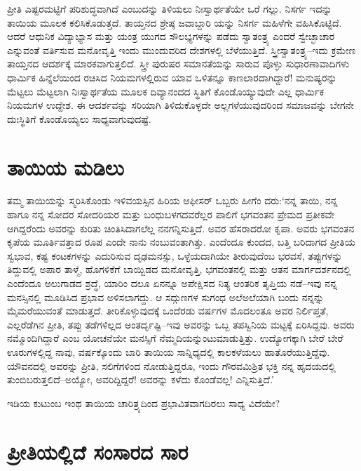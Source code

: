 ಪ್ರೀತಿ ಎಷ್ಟರಮಟ್ಟಿಗೆ ಪರಿಶುದ್ಧವಾಗಿದೆ ಎಂಬುದನ್ನು ತಿಳಿಯಲು ನಿಃಸ್ವಾರ್ಥತೆಯೇ ಒರೆ ಗಲ್ಲು. ನಿಸರ್ಗ ಇದನ್ನು ತಾಯಿಯ ಮೂಲಕ ಕಲಿಸಿಕೊಡುತ್ತದೆ. ತಾಯ್ತನದ ಶ್ರೇಷ್ಠ ಜವಾಬ್ದಾರಿ ಯನ್ನು ನಿಸರ್ಗ ಮಹಿಳೆಗೇ ವಹಿಸಿಕೊಟ್ಟಿದೆ. ಆದರೆ ಆಧುನಿಕ ವಿದ್ಯಾಭ್ಯಾಸ ಮತ್ತು ಯಂತ್ರ ಯುಗದ ಸೌಲಭ್ಯಗಳನ್ನು ಪಡೆದು ಸ್ವಾತಂತ್ರ್ಯ ಎಂದರೆ ಸ್ವೇಚ್ಛಾಚಾರ ಎನ್ನುವಂತೆ ವರ್ತಿಸುವ ಮನೋವೃತ್ತಿ ಇಂದು ಮುಂದುವರಿದ ದೇಶಗಳಲ್ಲಿ ಬೆಳೆಯುತ್ತಿದೆ. ಸ್ತ್ರೀಸ್ವಾತಂತ್ರ್ಯ–ಇದು ಕ್ರಮೇಣ ತಾಯ್ತನದ ಆದರ್ಶಕ್ಕೆ ಮಾರಕವಾಗುತ್ತಲಿದೆ. ಸ್ತ್ರೀ ಪುರುಷರ ಸಮಾನತೆಯನ್ನು ಸಾರುವ ಪೊಳ್ಳು ಸುಧಾರಣಾವಾದಿಗಳು ಧಾರ್ಮಿಕ ಹಿನ್ನೆಲೆಯಿಂದ ರಚಿಸಿದ ನಿಯಮಗಳಲ್ಲಿರುವ ಯಾವ ಒಳಿತನ್ನೂ ಕಾಣಲಾರದಾಗಿದ್ದಾರೆ! ಮನುಷ್ಯರನ್ನು ಮೆಟ್ಟಲು ಮೆಟ್ಟಲಾಗಿ ನಿಃಸ್ವಾರ್ಥತೆಯ ಮೂಲಕ ದಿವ್ಯಾನಂದದ ಸ್ಥಿತಿಗೆ ಕೊಂಡೊಯ್ಯುವುದೇ ಎಲ್ಲ ಧಾರ್ಮಿಕ ನಿಯಮಗಳ ಉದ್ದೇಶ. ಈ ಆದರ್ಶವನ್ನು ಸರಿಯಾಗಿ ತಿಳಿದುಕೊಳ್ಳದೇ ಅಲ್ಲಗಳೆಯುವುದರಿಂದ ಸಮಾಜವನ್ನು ಬೇಗನೇ ದುಃಸ್ಥಿತಿಗೆ ಕೊಂಡೊಯ್ಯಲು ಸಾಧ್ಯವಾಗುವುದಷ್ಟೆ.


\section{ತಾಯಿಯ ಮಡಿಲು}

ತಮ್ಮ ತಾಯಿಯನ್ನು ಸ್ಮರಿಸಿಕೊಂಡು ಇಳಿವಯಸ್ಸಿನ ಹಿರಿಯ ಆಫೀಸರ್​ ಒಬ್ಬರು ಹೀಗೆಂ ದರು:‘ನನ್ನ ತಾಯಿ, ನನ್ನ ಹಾಗೂ ನನ್ನ ಸೋದರ ಸೋದರಿಯರ ಮತ್ತು ಬಂಧುಬಳಗದವರೆಲ್ಲರ ಪಾಲಿಗೆ ಭಗವಂತನ ಪ್ರೇಮದ ಪ್ರತೀಕವೇ ಆಗಿದ್ದರೆಂದು ಅವರನ್ನು ಕುರಿತು ಚಿಂತಿಸಿದಾಗಲೆಲ್ಲ ನನಗನ್ನಿಸುತ್ತಿದೆ. ಅವರ ಹೆಸರಾದರೋ ಕೃಪಾ. ಅವರು ಭಗವಂತನ ಕೃಪೆಯ ಮೂರ್ತಿವತ್ತಾದ ರೂಪ ಎಂದೇ ನಾನು ನಂಬುವಂತಾಗಿತ್ತು. ಎಂದೆಂದೂ ಕುಂದದ, ಬತ್ತಿ ಬರಿದಾಗದ ಪ್ರೀತಿಯ ಸ್ವಭಾವ, ಕಷ್ಟ ಕಂಟಕಗಳನ್ನು ಎದುರಿಸುವ ದೃಢಮನಸ್ಸು, ಒಳ್ಳೆಯದಾಗಿಯೇ ತೀರುವುದೆಂಬ ಭರವಸೆ, ತಪ್ಪುಗಳನ್ನು ತಿದ್ದುವಲ್ಲಿ ಅಪಾರ ತಾಳ್ಮೆ, ಹೊಗಳಿಕೆಗೆ ಬಾಯ್ಬಿಡದ ಮನೋವೃತ್ತಿ, ಭಗವಂತನಲ್ಲಿ ಮತ್ತು ಆತನ ಮಾರ್ಗದರ್ಶನದಲ್ಲಿ ಎಂದೆಂದೂ ಅಲುಗಾಡದ ಶ್ರದ್ಧೆ, ಯಾರಿಂ ದಲೂ ಏನನ್ನೂ ಅಪೇಕ್ಷಿಸದ ನಿತ್ಯ ಆಂತರಿಕ ತೃಪ್ತಿಯ ನಡೆ–ಇವು ನನ್ನ ಮನಸ್ಸಿನಲ್ಲಿ ಮೂಡಿಸಿದ ಪ್ರಭಾವ ಅಳಿಸಲಾಗದ್ದು. ಆ ಸದ್ಗುಣಗಳ ಸುಗಂಧ ಅಲೆಅಲೆಯಾಗಿ ಬಂದು ನನ್ನನ್ನು ಮೈಮರೆಯುವಂತೆ ಮಾಡುತ್ತದೆ. ತೀರಿಕೊಳ್ಳುವುದಕ್ಕೆ ಒಂದೆರಡು ವರ್ಷಗಳ ಮೊದಲಂತೂ ಅವರ ನಿರ್ಲಿಪ್ತತೆ, ಎಲ್ಲರೆಡೆಗಿನ ಪ್ರೀತಿ, ತಪ್ಪು ತಡೆಗಳಿಲ್ಲದ ಅಂತರ್ದೃಷ್ಟಿ–ಇವು ಅವರನ್ನು ಒಬ್ಬ ತಪಸ್ವಿನಿಯ ಮಟ್ಟಕ್ಕೆ ಏರಿಸಿದ್ದವು. ಅವರು ನಮ್ಮೊಂದಿಗಿದ್ದಾರೆ ಎಂಬ ಯೋಚನೆಯೇ ಮನಸ್ಸಿಗೆ ನೆಮ್ಮದಿಯನ್ನುಂಟುಮಾಡುತ್ತಿತ್ತು. ಉದ್ಯೋಗಕ್ಕಾಗಿ ಬೇರೆ ಬೇರೆ ಊರುಗಳಲ್ಲಿದ್ದ ನಾವು, ವರ್ಷಕ್ಕೊಂದು ಬಾರಿ ತಾಯಿಯ ಸಾನ್ನಿಧ್ಯದಲ್ಲಿ ಕಾಲಕಳೆಯಲು ಹಾತೊರೆಯುತ್ತಿದ್ದೆವು. ಯೌವನದಲ್ಲಿ ಅವರನ್ನು ಪ್ರೀತಿ, ಸಲಿಗೆಗಳಿಂದ ನೋಡುತ್ತಿದ್ದರೂ, ಇಂದು ಗೌರವಮಿಶ್ರಿತ ಭಕ್ತಿ ನನ್ನ ಹೃದಯದಲ್ಲಿ ತುಂಬಿಬರುತ್ತಲಿದೆ–ಅಯ್ಯೋ, ಅವರಿದ್ದಿದ್ದರೆ! ಅವರನ್ನು ಕಳೆದು ಕೊಂಡೆವಲ್ಲ! ಎನ್ನಿಸುತ್ತಿದೆ.’

ಇಡಿಯ ಕುಟುಂಬ ಇಂಥ ತಾಯಿಯ ಚಾರಿತ್ರ್ಯದಿಂದ ಪ್ರಭಾವಿತವಾಗದಿರಲು ಸಾಧ್ಯ ವಿದೆಯೇ?


\section{ಪ್ರೀತಿಯಲ್ಲಿದೆ ಸಂಸಾರದ ಸಾರ}

